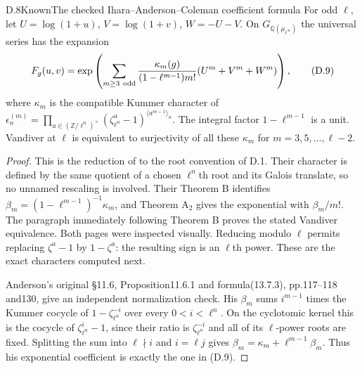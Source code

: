 \begin{statement}{D.8}{Known}{The checked Ihara--Anderson--Coleman coefficient formula}
For odd $\ell$, let $U=\log(1+u)$, $V=\log(1+v)$, $W=-U-V$. On $G_{\mathbb Q(\mu_{\ell^\infty})}$ the universal series has the expansion
\[
 F_g(u,v)=\exp\left(\sum_{m\geq3\ {\rm odd}}
 \frac{\kappa_m(g)}{(1-\ell^{m-1})m!}
 (U^m+V^m+W^m)\right),                                  \tag{D.9}
\]
where $\kappa_m$ is the compatible Kummer character of
$\epsilon_n^{(m)}=\prod_{a\in(\mathbb Z/\ell^n)^\times}(\zeta_{\ell^n}^a-1)^{\langle a^{m-1}\rangle_n}$.
The integral factor $1-\ell^{m-1}$ is a unit. Vandiver at $\ell$ is equivalent to surjectivity of all these $\kappa_m$ for $m=3,5,\ldots,\ell-2$.
\end{statement}
\begin{proof}
This is the reduction of \cite[Theorems A$_2$ and B, equations(9)--(11)]{dIKY1987} to the root convention of D.1. Their character is defined by the same quotient of a chosen $\ell^n$th root and its Galois translate, so no unnamed rescaling is involved. Their Theorem B identifies $\beta_m=(1-\ell^{m-1})^{-1}\kappa_m$, and Theorem A$_2$ gives the exponential with $\beta_m/m!$. The paragraph immediately following Theorem B proves the stated Vandiver equivalence. Both pages were inspected visually. Reducing modulo $\ell$ permits replacing $\zeta^a-1$ by $1-\zeta^a$: the resulting sign is an $\ell$th power. These are the exact characters computed next.

Anderson's original \S11.6, Proposition11.6.1 and formula(13.7.3),
pp.117--118 and130, give an independent normalization check.
His $\beta_m$ sums $i^{m-1}$ times the Kummer cocycle of
$1-\zeta_{\ell^n}^{-i}$ over every $0<i<\ell^n$.
On the cyclotomic kernel this is the cocycle of
$\zeta_{\ell^n}^{i}-1$, since their ratio is
$\zeta_{\ell^n}^{-i}$ and all of its $\ell$-power roots are fixed.
Splitting the sum into $\ell\nmid i$ and $i=\ell j$ gives
$\beta_m=\kappa_m+\ell^{m-1}\beta_m$.
Thus his exponential coefficient is exactly the one in (D.9).
\end{proof}


